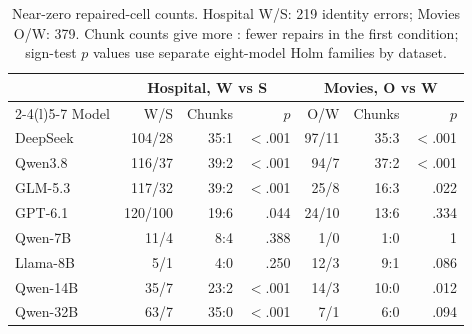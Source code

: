 \begin{table}[t]
  \caption{Near-zero repaired-cell counts. Hospital W/S: 219 identity errors; Movies O/W: 379.
  Chunk counts give more : fewer repairs in the first condition;
  sign-test $p$ values use separate eight-model Holm families by dataset.}
  \label{tab:counts}
  \small
  \setlength{\tabcolsep}{3.5pt}
  \begin{tabular*}{\columnwidth}{@{\extracolsep{\fill}}l rrr rrr@{}}
    \toprule
    & \multicolumn{3}{c}{Hospital, W vs S} & \multicolumn{3}{c}{Movies, O vs W} \\
    \cmidrule(lr){2-4}\cmidrule(l){5-7}
    Model & W/S & Chunks & $p$ & O/W & Chunks & $p$ \\
    \midrule
    DeepSeek & 104/28 & 35:1 & $<$.001 & 97/11 & 35:3 & $<$.001 \\
    Qwen3.8 & 116/37 & 39:2 & $<$.001 & 94/7 & 37:2 & $<$.001 \\
    GLM-5.3 & 117/32 & 39:2 & $<$.001 & 25/8 & 16:3 & .022 \\
    GPT-6.1 & 120/100 & 19:6 & .044 & 24/10 & 13:6 & .334 \\
    \midrule
    Qwen-7B & 11/4 & 8:4 & .388 & 1/0 & 1:0 & 1 \\
    Llama-8B & 5/1 & 4:0 & .250 & 12/3 & 9:1 & .086 \\
    Qwen-14B & 35/7 & 23:2 & $<$.001 & 14/3 & 10:0 & .012 \\
    Qwen-32B & 63/7 & 35:0 & $<$.001 & 7/1 & 6:0 & .094 \\
    \bottomrule
  \end{tabular*}
\end{table}
